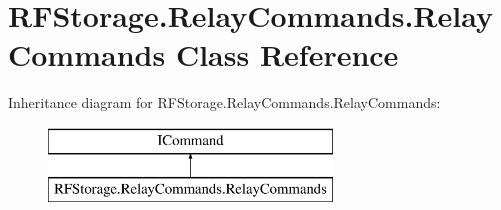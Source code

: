 \hypertarget{class_r_f_storage_1_1_relay_commands_1_1_relay_commands}{}\section{R\+F\+Storage.\+Relay\+Commands.\+Relay\+Commands Class Reference}
\label{class_r_f_storage_1_1_relay_commands_1_1_relay_commands}
Inheritance diagram for R\+F\+Storage.\+Relay\+Commands.\+Relay\+Commands\+:\begin{figure}[H]
\begin{center}
\leavevmode
\includegraphics[height=2.000000cm]{class_r_f_storage_1_1_relay_commands_1_1_relay_commands}
\end{center}
\end{figure}
